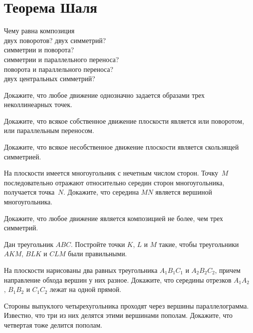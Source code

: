 
\section*{Теорема Шаля}


\begin{problems}

\item
Чему равна композиция
\\
\subproblem двух поворотов?
\quad
\subproblem двух симметрий?
\\
\subproblem симметрии и поворота?
\\
\subproblem симметрии и параллельного переноса?
\\
\subproblem поворота и параллельного переноса?
\\
\subproblem двух центральных симметрий?

\item
Докажите, что любое движение однозначно задается образами трех неколлинеарных
точек.

\item
Докажите, что всякое собственное движение плоскости является или поворотом, или
параллельным переносом.

\item
Докажите, что всякое несобственное движение плоскости является скользящей
симметрией.

\item
На плоскости имеется многоугольник с нечетным числом сторон.
Точку~$M$ последовательно отражают относительно середин сторон многоугольника,
получается точка~$N$.
Докажите, что середина $MN$ является вершиной многоугольника.

\item
Докажите, что любое движение является композицией не более, чем трех симметрий.

\item
Дан треугольник $ABC$.
Постройте точки $K$, $L$ и $M$ такие, чтобы треугольники $AKM$, $BLK$ и $CLM$
были правильными.

\item
На плоскости нарисованы два равных треугольника $A_1 B_1 C_1$ и $A_2 B_2 C_2$,
причем направление обхода вершин у них разное.
Докажите, что середины отрезков $A_1 A_2$, $B_1 B_2$ и $C_1 C_2$ лежат на одной
прямой.

\item
Стороны выпуклого четырехугольника проходят через вершины параллелограмма.
Известно, что три из них делятся этими вершинами пополам.
Докажите, что четвертая тоже делится пополам.


\end{problems}

